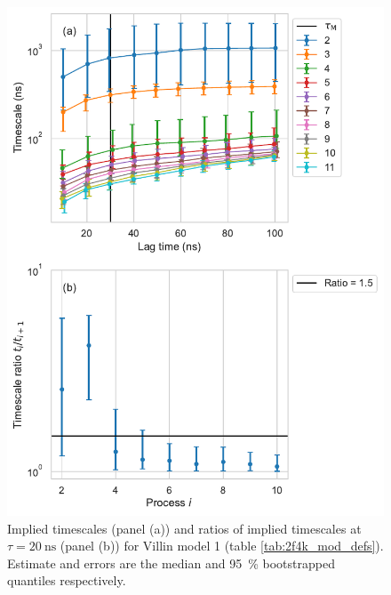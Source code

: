 \documentclass{article}
\begin{document}
\begin{figure}[h]
    \centering
    \includegraphics[height=0.65\textheight]{figures/its/villin/Villin_model_dihed._method_m1.pdf}
    \caption{Implied timescales (panel (a)) and ratios of implied timescales at $\tau=\SI{20}{\nano\second}$ (panel (b)) for Villin model 1 (table \ref{tab:2f4k_mod_defs}). Estimate and errors are the median and \SI{95}{\percent} bootstrapped quantiles respectively.}
    \label{fig:its_villin_1}
\end{figure}
\end{document}
